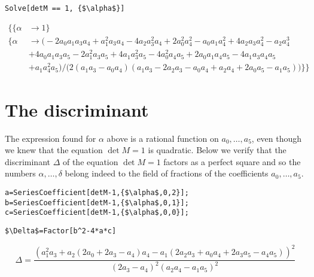 \begin{lstlisting}
Solve[detM == 1, {$\alpha$}]
\end{lstlisting}
\begin{small}
 \begin{align*}
  \big\{\{ \alpha &\to 1 \} \\
  \{\alpha &\to \big(-2 a_0 a_1 a_3 a_4+a_1^2 a_3 a_4 -4 a_2 a_3^2 a_4+2 a_0^2 a_4^2-a_0 a_1 a_4^2+4 a_2 a_3 a_4^2-a_2 a_4^3 \\
  & +4 a_0 a_1 a_3 a_5-2 a_1^2 a_3 a_5+4 a_1 a_3^2 a_5-4 a_0^2 a_4 a_5+2 a_0 a_1 a_4 a_5 -4 a_1 a_3 a_4 a_5 \\
  &+a_1 a_4^2 a_5\big) / \big(2 (a_1 a_3-a_0 a_4) (a_1 a_3-2 a_2 a_3-a_0 a_4+a_2 a_4+2 a_0 a_5-a_1 a_5)\big) \}\big\} \phantom{\alpha}
 \end{align*}
\end{small}
\noindent\makebox[\linewidth]{\rule{\textwidth}{0.4pt}}

\section{The discriminant}

The expression found for $\alpha$ above is a rational function on $a_0,\ldots,a_5$, even though we knew that the equation $\det M = 1$ is quadratic. Below we verify that the discriminant $\Delta$ of the equation $\det M = 1$ factors as a perfect square and so the numbers $\alpha,\ldots,\delta$ belong indeed to the field of fractions of the coefficients $a_0,\ldots,a_5$.

\bigskip
\bigskip

\begin{lstlisting}
a=SeriesCoefficient[detM-1,{$\alpha$,0,2}];
b=SeriesCoefficient[detM-1,{$\alpha$,0,1}];
c=SeriesCoefficient[detM-1,{$\alpha$,0,0}];
\end{lstlisting}

\noindent\makebox[\linewidth]{\rule{\textwidth}{0.4pt}}
\begin{lstlisting}
$\Delta$=Factor[b^2-4*a*c]
\end{lstlisting}
\begin{small}
 \begin{equation*}
  \Delta = \frac{\left(a_1^2 a_3 +a_2 (2 a_0+2 a_3-a_4) a_4-a_1 (2 a_2 a_3+a_0 a_4+2 a_3 a_5-a_4 a_5)\right)^2}{(2a_3-a_4)^2 (a_2a_4-a_1a_5)^2}
 \end{equation*}
\end{small}
\noindent\makebox[\linewidth]{\rule{\textwidth}{0.4pt}}























